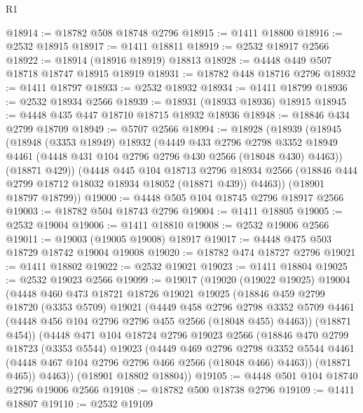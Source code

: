 \begin{lexlean}{R1}
\begin{coremodule}
@18914 := @18782 @508 @18748 @2796
@18915 := @1411 @18800
@18916 := @2532 @18915
@18917 := @1411 @18811
@18919 := @2532 @18917 @2566
@18922 := @18914 (@18916 @18919) @18813
@18928 := @4448 @449 @507 @18718 @18747 @18915 @18919
@18931 := @18782 @448 @18716 @2796
@18932 := @1411 @18797
@18933 := @2532 @18932
@18934 := @1411 @18799
@18936 := @2532 @18934 @2566
@18939 := @18931 (@18933 @18936) @18915
@18945 := @4448 @435 @447 @18710 @18715 @18932 @18936
@18948 := @18846 @434 @2799 @18709
@18949 := @5707 @2566
@18994 := @18928
    (@18939
      (@18945
        (@18948
          (@3353 @18949)
          @18932
          (@4449
            @433
            @2796
            @2798
            @3352
            @18949
            @4461
            (@4448 @431 @104 @2796 @2796 @430 @2566 (@18048 @430) @4463))
          (@18871 @429))
        (@4448
          @445
          @104
          @18713
          @2796
          @18934
          @2566
          (@18846 @444 @2799 @18712 @18032 @18934 @18052 (@18871 @439))
          @4463))
      (@18901 @18797 @18799))
@19000 := @4448 @505 @104 @18745 @2796 @18917 @2566
@19003 := @18782 @504 @18743 @2796
@19004 := @1411 @18805
@19005 := @2532 @19004
@19006 := @1411 @18810
@19008 := @2532 @19006 @2566
@19011 := @19003 (@19005 @19008) @18917
@19017 := @4448 @475 @503 @18729 @18742 @19004 @19008
@19020 := @18782 @474 @18727 @2796
@19021 := @1411 @18802
@19022 := @2532 @19021
@19023 := @1411 @18804
@19025 := @2532 @19023 @2566
@19099 := @19017
    (@19020
      (@19022 @19025)
      @19004
      (@4448
        @460
        @473
        @18721
        @18726
        @19021
        @19025
        (@18846
          @459
          @2799
          @18720
          (@3353 @5709)
          @19021
          (@4449
            @458
            @2796
            @2798
            @3352
            @5709
            @4461
            (@4448 @456 @104 @2796 @2796 @455 @2566 (@18048 @455) @4463))
          (@18871 @454))
        (@4448
          @471
          @104
          @18724
          @2796
          @19023
          @2566
          (@18846
            @470
            @2799
            @18723
            (@3353 @5544)
            @19023
            (@4449
              @469
              @2796
              @2798
              @3352
              @5544
              @4461
              (@4448 @467 @104 @2796 @2796 @466 @2566 (@18048 @466) @4463))
            (@18871 @465))
          @4463))
      (@18901 @18802 @18804))
@19105 := @4448 @501 @104 @18740 @2796 @19006 @2566
@19108 := @18782 @500 @18738 @2796
@19109 := @1411 @18807
@19110 := @2532 @19109

\end{coremodule}
\end{lexlean}
